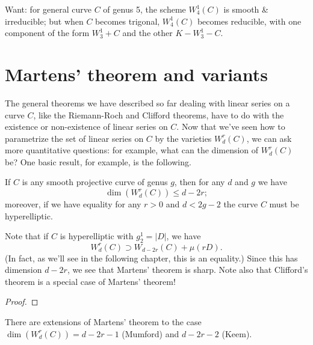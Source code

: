 Want: for general curve $C$ of genus 5, the scheme $W^1_4(C)$ is smooth \& irreducible; but when $C$ becomes trigonal, $W^1_4(C)$ becomes reducible, with one component of the form $W^1_3 + C$ and the other $K - W^1_3 - C$.

\section{Martens' theorem and variants}

The general theorems we have described so far dealing with linear series on a curve $C$, like the Riemann-Roch and Clifford theorems, have to do with the existence or non-existence of linear series on $C$. Now that we've seen how to parametrize the set of linear series on $C$ by the varieties $W^r_d(C)$, we can ask more quantitative questions: for example, what can the dimension of $W^r_d(C)$ be? One basic result, for example, is the following.

\begin{theorem}
If $C$ is any smooth projective curve of genus $g$, then for any $d$ and $g$ we have
$$
\dim(W^r_d(C)) \leq d-2r;
$$
moreover, if we have equality for any $r > 0$ and $d < 2g-2$ the curve $C$ must be hyperelliptic.
\end{theorem}

Note that if $C$ is hyperelliptic with $g^1_2 = |D|$, we have
$$
W^r_d(C) \supset W_{d-2r}(C) + \mu(rD).
$$
(In fact, as we'll see in the following chapter, this is an equality.) Since this has dimension $d-2r$, we see that Martens' theorem is sharp. Note also that Clifford's theorem is a special case of Martens' theorem!

\begin{proof}

\end{proof}

There are extensions of Martens' theorem to the case $\dim(W^r_d(C)) = d-2r-1$ (Mumford) and $d-2r-2$ (Keem).

